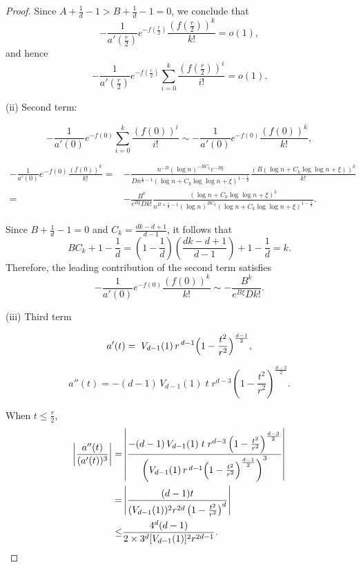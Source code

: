 \documentclass[preprint,12pt]{elsarticle}
\begin{document}
\begin{proof}
	Since  $A+\frac{1}{d}-1 > B + \frac{1}{d}-1 = 0$, we conclude that
	$$
	 -\frac{1}{a'(\frac{r}{2})}e^{-f(\frac{r}{2})}\frac{(f(\frac{r}{2}))^k}{k!} = o(1),
	$$
	and hence
	$$
		-\frac{1}{a'(\frac{r}{2})}e^{-f(\frac{r}{2})}\sum_{i=0}^{k}\frac{(f(\frac{r}{2}))^i}{i!} = o(1).
	$$
	
	(ii) Second term:
	
	$$
	-\frac{1}{a'(0)}e^{-f(0)}\sum_{i=0}^{k}\frac{(f(0))^i}{i!} \sim -\frac{1}{a'(0)}e^{-f(0)}\frac{(f(0))^k}{k!},
	$$
	
	\begin{equation*}
		\begin{aligned}
			-\frac{1}{a'(0)}e^{-f(0)}\frac{(f(0))^k}{k!} =& -\frac{n^{-B} (\log n)^{-BC_k}e^{-B\xi}}{Dn^{\frac{1}{d}-1}\left(\log n+ C_k \log\log n+\xi\right)^{1-\frac{1}{d}}} \frac{(B\left( \log n+ C_k \log\log n+\xi\right))^k}{k!} \\
			= & -\frac{B^k}{e^{B\xi}Dk!} \frac{\left( \log n+ C_k \log\log n+\xi\right)^k}{n^{B+\frac{1}{d}-1}(\log n)^{BC_k}\left(\log n+ C_k \log\log n+\xi\right)^{1-\frac{1}{d}}}.
		\end{aligned}
	\end{equation*}
	
	Since $B + \frac{1}{d} - 1 = 0$ and $C_k=\frac{dk-d+1}{d-1}$, it follows that
	$$
		BC_k + 1 - \frac{1}{d} = \left(1-\frac{1}{d}\right)\left(\frac{dk-d+1}{d-1}\right)+1-\frac{1}{d} = k.
	$$
	Therefore, the leading contribution of the second term satisfies
	$$
		-\frac{1}{a'(0)}e^{-f(0)}\frac{(f(0))^k}{k!} \sim -\frac{B^k}{e^{B\xi}Dk!}.
	$$
	

	(iii) Third term

	
	$$
	a'(t)
	=\;V_{d-1}(1)\,r^{\,d-1}\Bigl(1-\frac{t^2}{r^2}\Bigr)^{\frac{d-1}2},
	$$
	
	$$
	a''(t)
	= - (d-1)\,V_{d-1}(1)\; t\; r^{d-3}\left(1 - \frac{t^2}{r^2}\right)^{\frac{d-3}{2}}.
	$$
	
	When $t\leq \frac{r}{2}$,
	\begin{equation*}
		\begin{aligned}
			\left|\frac{a''(t)}{(a'(t))^3}\right|=&\left|\frac{- (d-1)\,V_{d-1}(1)\; t\; r^{d-3}\left(1 - \frac{t^2}{r^2}\right)^{\frac{d-3}{2}}}{\left(V_{d-1}(1)\,r^{\,d-1}\Bigl(1-\frac{t^2}{r^2}\Bigr)^{\frac{d-1}2}\right)^3}\right| \\
			=& \left|\frac{(d-1)t}{(V_{d-1}(1))^2r^{2d}\left(1 - \frac{t^2}{r^2}\right)^{d}}\right| \\
			\leq& \frac{4^d(d-1)}{2\times 3^d[V_{d-1}(1)]^2r^{2d-1}}.
		\end{aligned}
	\end{equation*}
	

\end{proof}
\end{document}
